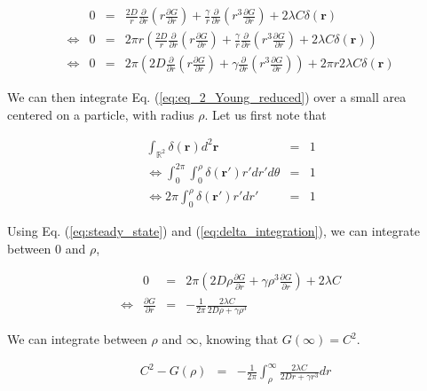 \begin{align}
 & 0 & = & \frac{2D}{r}\frac{\partial}{\partial r}\left(r\frac{\partial G}{\partial r}\right)+\frac{\gamma}{r}\frac{\partial}{\partial r}\left(r^{3}\frac{\partial G}{\partial r}\right)+2\lambda C\delta(\boldsymbol{r})\nonumber \\
\Leftrightarrow & 0 & = & 2\pi r\left(\frac{2D}{r}\frac{\partial}{\partial r}\left(r\frac{\partial G}{\partial r}\right)+\frac{\gamma}{r}\frac{\partial}{\partial r}\left(r^{3}\frac{\partial G}{\partial r}\right)+2\lambda C\delta(\boldsymbol{r})\right)\nonumber \\
\Leftrightarrow & 0 & = & 2\pi\left(2D\frac{\partial}{\partial r}\left(r\frac{\partial G}{\partial r}\right)+\gamma\frac{\partial}{\partial r}\left(r^{3}\frac{\partial G}{\partial r}\right)\right)+2\pi r2\lambda C\delta(\boldsymbol{r})\label{eq:steady_state}
\end{align}

We can then integrate Eq. (\ref{eq:eq_2_Young_reduced}) over a small
area centered on a particle, with radius $\rho$. Let us first note
that

\begin{eqnarray}
\int_{\mathbb{R}^{2}}\delta(\boldsymbol{r})d^{2}\boldsymbol{r} & = & 1\nonumber \\
\Leftrightarrow\int_{0}^{2\pi}\int_{0}^{\rho}\delta(\boldsymbol{r'})r'dr'd\theta & = & 1\nonumber \\
\Leftrightarrow2\pi\int_{0}^{\rho}\delta(\boldsymbol{r'})r'dr' & = & 1\label{eq:delta_integration}
\end{eqnarray}

Using Eq. (\ref{eq:steady_state}) and (\ref{eq:delta_integration}),
we can integrate between 0 and $\rho$, 

\begin{align}
 & 0 & = & 2\pi\left(2D\rho\frac{\partial G}{\partial r}+\gamma\rho^{3}\frac{\partial G}{\partial r}\right)+2\lambda C\nonumber \\
\Leftrightarrow & \frac{\partial G}{\partial r} & = & -\frac{1}{2\pi}\frac{2\lambda C}{2D\rho+\gamma\rho^{3}}\label{eq:deriv_G_r}
\end{align}

We can integrate between $\rho$ and $\infty$, knowing that $G(\infty)=C^{2}.$

\begin{align}
 & C^{2}-G(\rho) & = & -\frac{1}{2\pi}{\displaystyle \int_{\rho}^{\infty}}\frac{2\lambda C}{2Dr+\gamma r^{3}}dr\label{eq:deriv_G_r_int1}
\end{align}

